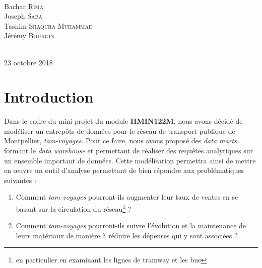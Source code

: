 \documentclass[a4paper,12pt]{report}
\begin{document}
\begin{titlepage}
\HRule \\[0.8cm]
\begin{minipage}{\textwidth}
\centering \huge
Bachar \textsc{Rima}\\ %
Joseph \textsc{Saba}\\ %
Tasnim \textsc{Shaqura Muhammad}\\ %
Jérémy \textsc{Bourgin} %
\end{minipage} \\[0.8cm]
{\large 23 octobre 2018}\\[1cm]
\hspace{\fill}
\vfill %
\end{titlepage}

\pagestyle{plain}

{
  \hypersetup{linkcolor=black}
  \tableofcontents
}

\newpage

\chapter*{Introduction}
\label{chap:intro}
Dans le cadre du mini-projet du module \textbf{HMIN122M}, nous avons décidé de modéliser un entrepôts de données pour le réseau de transport publique de Montpellier, \textit{tam-voyages}. Pour ce faire, nous avons proposé des \textit{data marts} formant le \textit{data warehouse} et permettant de réaliser des requêtes analytiques sur un ensemble important de données. Cette modélisation permettra ainsi de mettre en \oe{}uvre un outil d'analyse permettant de bien répondre aux problématiques suivantes :
\begin{enumerate}
  \item Comment \textit{tam-voyages} pourront-ils augmenter leur taux de ventes en se basant sur la circulation du réseau\footnote{en particulier en examinant les lignes de tramway et les bus} ?
  \item Comment \textit{tam-voyages} pourront-ils suivre l'évolution et la maintenance de leurs matériaux de manière à réduire les dépenses qui y sont associées ?
\end{enumerate}
\end{document}
